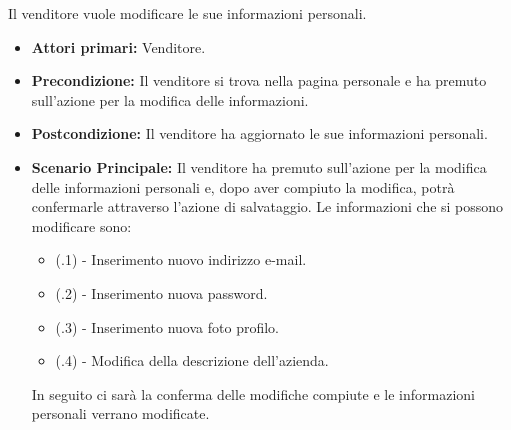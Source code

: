 Il venditore vuole modificare le sue informazioni personali.
\begin{itemize}
    \item \textbf{Attori primari:} Venditore.
    \item \textbf{Precondizione:} Il venditore si trova nella pagina personale e ha premuto sull'azione per la modifica delle informazioni.
    \item \textbf{Postcondizione:} Il venditore ha aggiornato le sue informazioni personali.
    \item \textbf{Scenario Principale:} Il venditore ha premuto sull'azione per la modifica delle informazioni personali e, dopo aver compiuto la modifica, potrà confermarle attraverso l'azione di salvataggio. Le informazioni che si possono modificare sono:
    \begin{itemize}
        \item (\actualUC.1) - Inserimento nuovo indirizzo e-mail.
        \item (\actualUC.2) - Inserimento nuova password.
        \item (\actualUC.3) - Inserimento nuova foto profilo.
        \item (\actualUC.4) - Modifica della descrizione dell'azienda.
    \end{itemize}
    In seguito ci sarà la conferma delle modifiche compiute e le informazioni personali verrano modificate.
\end{itemize}

\resetSubUC

